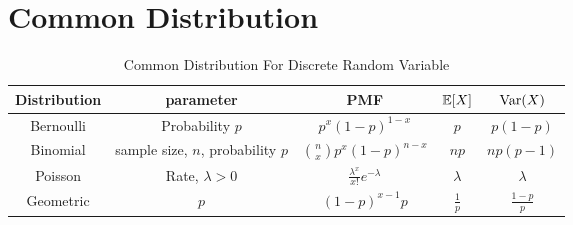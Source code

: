 \documentclass[10pt]{article}
\begin{document}
\section{Common Distribution}
\begin{table}[h]
	\centering
	\caption{Common Distribution For Discrete Random Variable}
	\begin{tabular}{c|c|c|c|c}
		Distribution &  parameter & PMF & $\mathbb{E}[X]$ & $\text{Var}(X)$\\
		\hline
		Bernoulli & Probability $p$ & $p^x(1-p)^{1-x}$ & $p$ & $p(1-p)$ \\
		\hline
		Binomial & sample size, $n$, probability $p$ & $\binom{n}{x}p^x(1-p)^{n-x}$ & $np$ & $np(p-1)$ \\
		\hline
		Poisson & Rate, $\lambda>0$ & $\frac{\lambda^x}{x!}e^{-\lambda}$ & $\lambda$  & $\lambda$\\
		\hline
		Geometric & $p$ & $(1-p)^{x-1}p$ & $\frac{1}{p}$ & $\frac{1-p}{p}$ \\
	\end{tabular}
\end{table}
\end{document}
